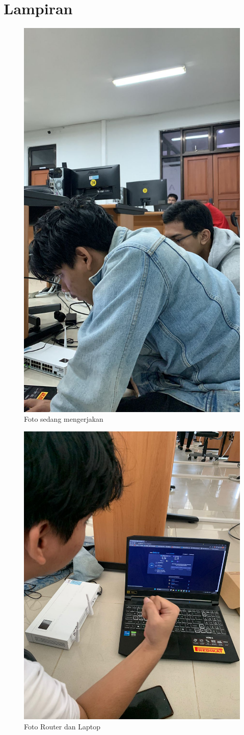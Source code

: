 \documentclass{article}
\begin{document}
    \section{Lampiran}
    \begin{figure}[h!]
        \centering
        \includegraphics[width=0.3\linewidth]{Kelompok.jpeg}
        \caption{Foto sedang mengerjakan}
    \end{figure}
    \begin{figure}[h!]
        \centering
        \includegraphics[width=0.35\linewidth]{Done.jpeg}
        \caption{Foto Router dan Laptop}
    \end{figure}
\end{document}
